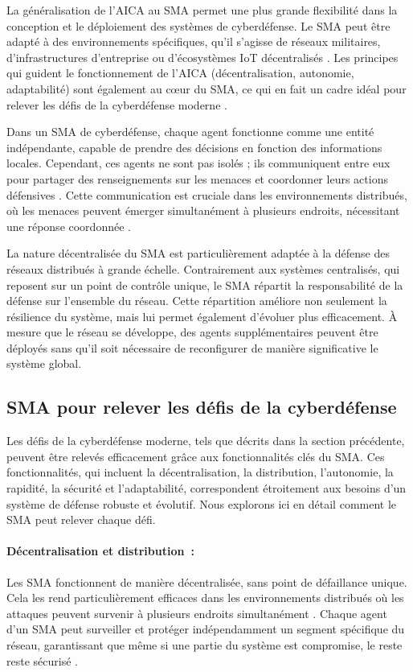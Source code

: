 La généralisation de l'AICA au SMA permet une plus grande flexibilité dans la conception et le déploiement des systèmes de cyberdéfense. Le SMA peut être adapté à des environnements spécifiques, qu'il s'agisse de réseaux militaires, d'infrastructures d'entreprise ou d'écosystèmes IoT décentralisés \cite{kott2023autonomous}. Les principes qui guident le fonctionnement de l'AICA (décentralisation, autonomie, adaptabilité) sont également au cœur du SMA, ce qui en fait un cadre idéal pour relever les défis de la cyberdéfense moderne \cite{kolias2011swarm}.

Dans un SMA de cyberdéfense, chaque agent fonctionne comme une entité indépendante, capable de prendre des décisions en fonction des informations locales. Cependant, ces agents ne sont pas isolés ; ils communiquent entre eux pour partager des renseignements sur les menaces et coordonner leurs actions défensives \cite{kolias2011swarm}. Cette communication est cruciale dans les environnements distribués, où les menaces peuvent émerger simultanément à plusieurs endroits, nécessitant une réponse coordonnée \cite{bace2001intrusion}.

La nature décentralisée du SMA est particulièrement adaptée à la défense des réseaux distribués à grande échelle. Contrairement aux systèmes centralisés, qui reposent sur un point de contrôle unique, le SMA répartit la responsabilité de la défense sur l'ensemble du réseau. Cette répartition améliore non seulement la résilience du système, mais lui permet également d'évoluer plus efficacement. À mesure que le réseau se développe, des agents supplémentaires peuvent être déployés sans qu'il soit nécessaire de reconfigurer de manière significative le système global.

\subsection{SMA pour relever les défis de la cyberdéfense}

Les défis de la cyberdéfense moderne, tels que décrits dans la section précédente, peuvent être relevés efficacement grâce aux fonctionnalités clés du SMA. Ces fonctionnalités, qui incluent la décentralisation, la distribution, l'autonomie, la rapidité, la sécurité et l'adaptabilité, correspondent étroitement aux besoins d'un système de défense robuste et évolutif. Nous explorons ici en détail comment le SMA peut relever chaque défi.

\paragraph{Décentralisation et distribution :}
Les SMA fonctionnent de manière décentralisée, sans point de défaillance unique. Cela les rend particulièrement efficaces dans les environnements distribués où les attaques peuvent survenir à plusieurs endroits simultanément \cite{kolias2011swarm}. Chaque agent d'un SMA peut surveiller et protéger indépendamment un segment spécifique du réseau, garantissant que même si une partie du système est compromise, le reste reste sécurisé \cite{shakarian2015cyber}.

